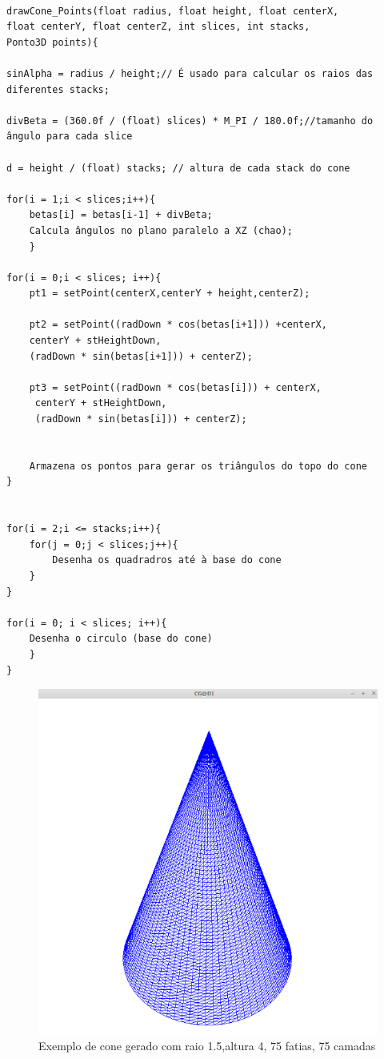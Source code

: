 \begin{Verbatim}

drawCone_Points(float radius, float height, float centerX, 
float centerY, float centerZ, int slices, int stacks, 
Ponto3D points){

sinAlpha = radius / height;// É usado para calcular os raios das diferentes stacks;

divBeta = (360.0f / (float) slices) * M_PI / 180.0f;//tamanho do 
ângulo para cada slice

d = height / (float) stacks; // altura de cada stack do cone

for(i = 1;i < slices;i++){
	betas[i] = betas[i-1] + divBeta;
	Calcula ângulos no plano paralelo a XZ (chao);
	}
	
for(i = 0;i < slices; i++){
	pt1 = setPoint(centerX,centerY + height,centerZ);
	
	pt2 = setPoint((radDown * cos(betas[i+1])) +centerX, 
	centerY + stHeightDown, 
	(radDown * sin(betas[i+1])) + centerZ);
	
	pt3 = setPoint((radDown * cos(betas[i])) + centerX,
	 centerY + stHeightDown,
	 (radDown * sin(betas[i])) + centerZ);


	Armazena os pontos para gerar os triângulos do topo do cone 
}


for(i = 2;i <= stacks;i++){
	for(j = 0;j < slices;j++){
		Desenha os quadradros até à base do cone
	}
}
	
for(i = 0; i < slices; i++){
	Desenha o circulo (base do cone)
	}
}

\end{Verbatim}


\begin{figure}[<+htpb+>]
	\centering
	\includegraphics[scale=0.5]{imagens/print_cone_raio1-5_altura4_slices75_stacks75}
	\caption{Exemplo de cone gerado com raio 1.5,altura 4, 75 fatias, 75 camadas}
	\label{p1:fig:p3_cone_2_3_10_10}
\end{figure}


